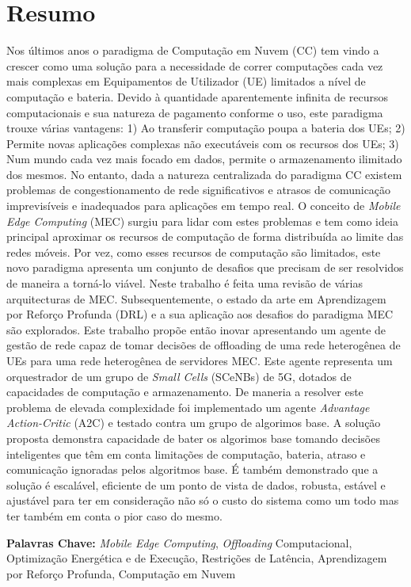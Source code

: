 \section*{Resumo}


\noindent Nos últimos anos o paradigma de Computação em Nuvem (\acrshort{CC}) tem vindo a crescer como uma solução para a necessidade de correr computações cada vez mais complexas em Equipamentos de Utilizador (\acrshort{UE}) limitados a nível de computação e bateria. Devido à quantidade aparentemente infinita de recursos computacionais e sua natureza de pagamento conforme o uso, este paradigma trouxe várias vantagens: 1) Ao transferir computação poupa a bateria dos UEs; 2) Permite novas aplicações complexas não executáveis com os recursos dos UEs; 3) Num mundo cada vez mais focado em dados, permite o armazenamento ilimitado dos mesmos. No entanto, dada a natureza centralizada do paradigma \acrshort{CC} existem problemas de congestionamento de rede significativos e atrasos de comunicação imprevisíveis e inadequados para aplicações em tempo real. O conceito de \emph{Mobile Edge Computing} (\acrshort{MEC}) surgiu para lidar com estes problemas e tem como ideia principal aproximar os recursos de computação de forma distribuída ao limite das redes móveis. Por vez, como esses recursos de computação são limitados, este novo paradigma apresenta um conjunto de desafios que precisam de ser resolvidos de maneira a torná-lo viável. Neste trabalho é feita uma revisão de várias arquitecturas de \acrshort{MEC}. Subsequentemente, o estado da arte em Aprendizagem por Reforço Profunda (\acrshort{DRL}) e a sua aplicação aos desafios do paradigma \acrshort{MEC} são explorados. Este trabalho propõe então inovar apresentando um agente de gestão de rede capaz de tomar decisões de offloading de uma rede heterogênea de UEs para uma rede heterogênea de servidores \acrshort{MEC}. Este agente representa um orquestrador de um grupo de \emph{Small Cells} (\acrshort{SCeNBs}) de 5G, dotados de capacidades de computação e armazenamento. De maneria a resolver este problema de elevada complexidade foi implementado um agente \emph{Advantage Action-Critic} (\acrshort{A2C}) e testado contra um grupo de algorimos base. A solução proposta demonstra capacidade de bater os algorimos base tomando decisões inteligentes que têm em conta limitações de computação, bateria, atraso e comunicação ignoradas pelos algoritmos base. É também demonstrado que a solução é escalável, eficiente de um ponto de vista de dados, robusta, estável e ajustável para ter em consideração não só o custo do sistema como um todo mas ter também em conta o pior caso do mesmo. 

\vfill

\textbf{\Large Palavras Chave:} \emph{Mobile Edge Computing}, \emph{Offloading} Computacional, Optimização Energética e de Execução, Restrições de Latência, Aprendizagem por Reforço Profunda, Computação em Nuvem

